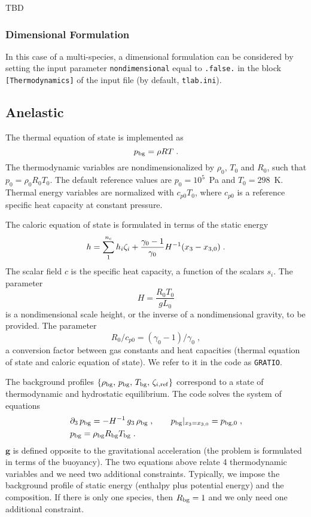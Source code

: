 TBD

\subsubsection{Dimensional Formulation}

In this case of a multi-species, a dimensional formulation can be considered by setting the input parameter \texttt{nondimensional} equal to \texttt{.false.} in the block \texttt{[Thermodynamics]} of the input file (by default, \texttt{tlab.ini}). 

\subsection{Anelastic}
The thermal equation of state is implemented as
\begin{equation}
    p\bg = \rho R T \;.
\end{equation}
The thermodynamic variables are nondimensionalized by $\rho_0$, $T_0$ and $R_0$, such that $p_0=\rho_0R_0T_0$. The default reference values are $p_0=10^5$~Pa and $T_0=298$~K. Thermal energy variables are normalized with $c_{p0}T_0$, where $c_{p0}$ is a reference specific heat capacity at constant pressure.

The caloric equation of state is formulated in terms of the static energy
\begin{equation}
    h =\sum^{n\sc}_1 h_{i} \zeta_i + \frac{\gamma_0-1}{\gamma_0}H^{-1}(x_3-x_{3,0}) \;.
\end{equation}
The scalar field $c$ is the specific heat capacity, a function of the scalars $s_i$. The parameter
\begin{equation}
    H = \frac{R_0T_0}{gL_0}
\end{equation}
is a nondimensional scale height, or the inverse of a nondimensional gravity, to be provided. The parameter
\begin{equation}
    R_0/c_{p0} =(\gamma_0-1)/\gamma_0 \;,
\end{equation}
a conversion factor between gas constants and heat capacities (thermal equation of state and caloric equation of state). We refer to it in the code as \texttt{GRATIO}. 

The background profiles $\{\rho\bg,\, p\bg,\, T\bg,\, \zeta_{i,\mathrm{ref}}\}$ correspond to a state of thermodynamic and hydrostatic equilibrium. The code solves the system of equations
\begin{subequations}
    \begin{align}
        &\partial_3\,p\bg=-H^{-1}\, g_3\,\rho\bg\;,\qquad p\bg|_{x_3=x_{3,0}}=p_{\mathrm{bg},0}\;,\\
        &p\bg  = \rho\bg R\bg T\bg \;.
    \end{align}
\end{subequations}
$\mathbf{g}$ is defined opposite to the gravitational acceleration (the problem is formulated in terms of the buoyancy). The two equations above relate 4 thermodynamic variables and we need two additional constraints. Typically, we impose the background profile of static energy (enthalpy plus potential energy) and the composition. If there is only one species, then $R\bg=1$ and we only need one additional constraint. 

